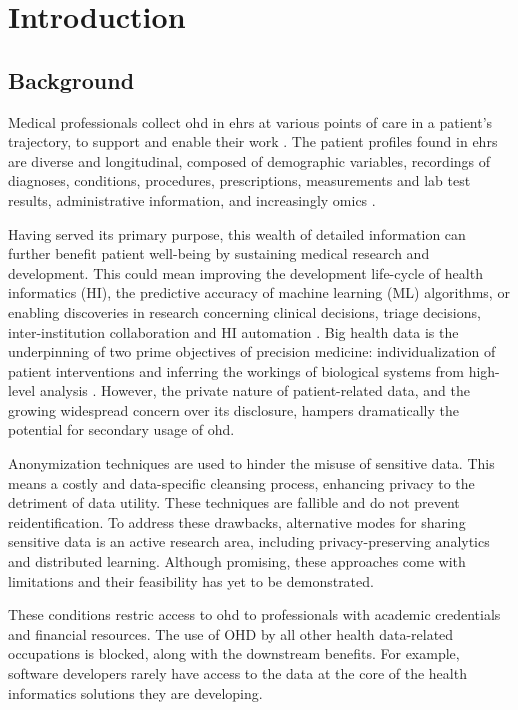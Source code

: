 \section{Introduction}
\subsection{Background}
Medical professionals collect \gls{ohd} in \glspl{ehr} at various points of care in a patient’s trajectory, to support and enable their work \cite{Cowie_2016}. The patient profiles found in \glspl{ehr} are diverse and longitudinal, composed of demographic variables, recordings of diagnoses, conditions, procedures, prescriptions, measurements and lab test results, administrative information, and increasingly omics \cite{Ohdsi2020-vf}.\par
Having served its primary purpose, this wealth of detailed information can further benefit patient well-being by sustaining medical research and development. This could mean improving the development life-cycle of health informatics (HI), the predictive accuracy of machine learning (ML) algorithms, or enabling discoveries in research concerning clinical decisions, triage decisions, inter-institution collaboration and HI automation \cite{Rudin_2020}. Big health data is the underpinning of two prime objectives of precision medicine: individualization of patient interventions and inferring the workings of biological systems from high-level analysis \cite{Capobianco2020}. However, the private nature of patient-related data, and the growing widespread concern over its disclosure, hampers dramatically the potential for secondary usage of \gls{ohd}.\par

Anonymization techniques are used to hinder the misuse of sensitive data. This means a costly and data-specific cleansing process, enhancing privacy to the detriment of data utility.  These techniques are fallible and do not prevent reidentification. To address these drawbacks, alternative modes for sharing sensitive data is an active research area, including privacy-preserving analytics and distributed learning. Although promising, these approaches come with limitations and their feasibility has yet to be demonstrated.\par
These conditions restric access to \gls{ohd} to professionals with academic credentials and financial resources. The use of OHD by all other health data-related occupations is blocked, along with the downstream benefits. For example, software developers rarely have access to the data at the core of the health informatics solutions they are developing.
